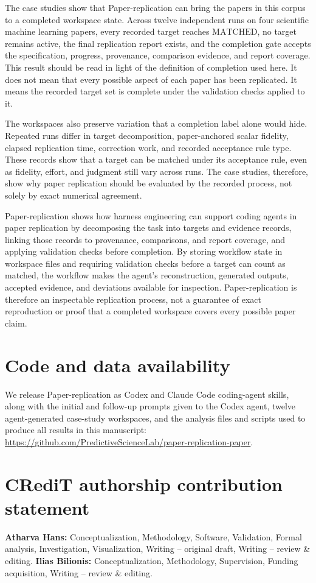 \documentclass[authoryear,5p,times,nopreprintline]{elsarticle}
\begin{document}
The case studies show that Paper-replication can bring the papers in this corpus to a completed workspace state.
Across twelve independent runs on four scientific machine learning papers, every recorded target reaches \(\mathrm{MATCHED}\), no target remains active, the final replication report exists, and the completion gate accepts the specification, progress, provenance, comparison evidence, and report coverage.
This result should be read in light of the definition of completion used here.
It does not mean that every possible aspect of each paper has been replicated.
It means the recorded target set is complete under the validation checks applied to it.

The workspaces also preserve variation that a completion label alone would hide.
Repeated runs differ in target decomposition, paper-anchored scalar fidelity, elapsed replication time, correction work, and recorded acceptance rule type.
These records show that a target can be matched under its acceptance rule, even as fidelity, effort, and judgment still vary across runs.
The case studies, therefore, show why paper replication should be evaluated by the recorded process, not solely by exact numerical agreement.

Paper-replication shows how harness engineering can support coding agents in paper replication by decomposing the task into targets and evidence records, linking those records to provenance, comparisons, and report coverage, and applying validation checks before completion.
By storing workflow state in workspace files and requiring validation checks before a target can count as matched, the workflow makes the agent's reconstruction, generated outputs, accepted evidence, and deviations available for inspection.
Paper-replication is therefore an inspectable replication process, not a guarantee of exact reproduction or proof that a completed workspace covers every possible paper claim.

\section*{Code and data availability}
We release Paper-replication as Codex and Claude Code coding-agent skills, along with the initial and follow-up prompts given to the Codex agent, twelve agent-generated case-study workspaces, and the analysis files and scripts used to produce all results in this manuscript: \url{https://github.com/PredictiveScienceLab/paper-replication-paper}.

\section*{CRediT authorship contribution statement}
\textbf{Atharva Hans:} Conceptualization, Methodology, Software, Validation, Formal analysis, Investigation, Visualization, Writing -- original draft, Writing -- review \& editing.
\textbf{Ilias Bilionis:} Conceptualization, Methodology, Supervision, Funding acquisition, Writing -- review \& editing.
\end{document}
